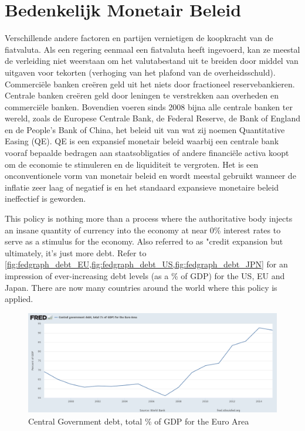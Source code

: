 \section{Bedenkelijk Monetair Beleid}
Verschillende andere factoren en partijen vernietigen de koopkracht van de fiatvaluta. Als een regering eenmaal een fiatvaluta heeft ingevoerd, kan ze meestal de verleiding niet weerstaan om het valutabestand uit te breiden door middel van uitgaven voor tekorten (verhoging van het plafond van de overheidsschuld). Commerciële banken creëren geld uit het niets door fractioneel reservebankieren. Centrale banken creëren geld door leningen te verstrekken aan overheden en commerciële banken. Bovendien voeren sinds 2008 bijna alle centrale banken ter wereld, zoals de Europese Centrale Bank, de Federal Reserve, de Bank of England en de People's Bank of China, het beleid uit van wat zij noemen Quantitative Easing (QE). QE is een expansief monetair beleid waarbij een centrale bank vooraf bepaalde bedragen aan staatsobligaties of andere financiële activa koopt om de economie te stimuleren en de liquiditeit te vergroten. Het is een onconventionele vorm van monetair beleid en wordt meestal gebruikt wanneer de inflatie zeer laag of negatief is en het standaard expansieve monetaire beleid ineffectief is geworden.

This policy is nothing more than a process where the authoritative body injects an insane quantity of currency into the economy at near 0\% interest rates to serve as a stimulus for the economy. Also referred to as "credit expansion but ultimately, it's just more debt. Refer to \cref{fig:fedgraph_debt_EU,fig:fedgraph_debt_US,fig:fedgraph_debt_JPN} for an impression of ever-increasing debt levels (as a \% of GDP) for the US, EU and Japan. There are now many countries around the world where this policy is applied.


    \begin{figure}
        \centering
        \caption{Central Government debt, total \% of GDP for the Euro Area}
        \includegraphics[width=\textwidth]{img/ch-history/fredgraph_debt_EU.png}
       
        \label{fig:fedgraph_debt_EU}
    \end{figure}
    

